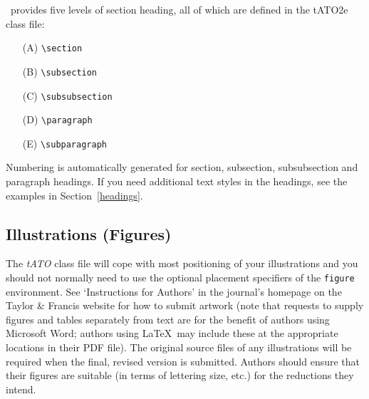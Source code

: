 \documentclass{tATO2e}
\begin{document}
\LaTeXe\ provides five levels of section heading, all of which are defined in the tATO2e class file:
\begin{enumerate}
   \item[(A)] \verb"\section"
   \item[(B)] \verb"\subsection"
   \item[(C)] \verb"\subsubsection"
   \item[(D)] \verb"\paragraph"
   \item[(E)] \verb"\subparagraph"
\end{enumerate}
Numbering is automatically generated for section, subsection, subsubsection and paragraph headings. If you need
additional text styles in the headings, see the examples in Section~\ref{headings}.


\subsection{Illustrations (Figures)}

The \textit{tATO} class file will cope with most positioning of your illustrations and you should not normally need to use the optional placement specifiers of the \texttt{figure} environment. See `Instructions for Authors' in the journal's homepage on the Taylor \& Francis website for how to submit artwork (note that requests to supply figures and tables separately from text are for the benefit of authors using Microsoft Word; authors using \LaTeX\ may include these at the appropriate locations in their PDF file). The original source files of any illustrations will be required when the final, revised version is submitted. Authors should ensure that their figures are suitable (in terms of lettering size, etc.) for the reductions they intend.
\end{document}
